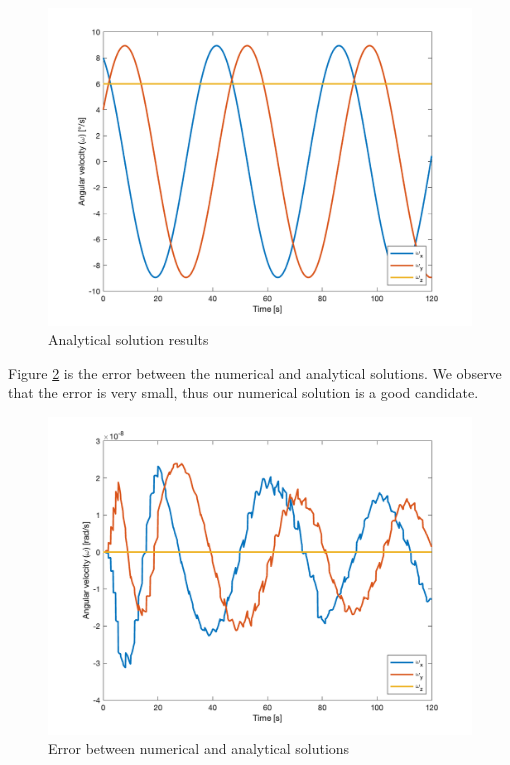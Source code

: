 \begin{figure}[H]
\centering
\includegraphics[scale=0.6]{Images/ps3_problem2.png}
\caption{Analytical solution results}
\label{fig:ps3_problem2}
\end{figure}

Figure \ref{fig:ps3_problem3} is the error between the numerical and analytical solutions. We observe that the error is very small, thus our numerical solution is a good candidate.

\begin{figure}[H]
\centering
\includegraphics[scale=0.6]{Images/ps3_problem3.png}
\caption{Error between numerical and analytical solutions}
\label{fig:ps3_problem3}
\end{figure}

